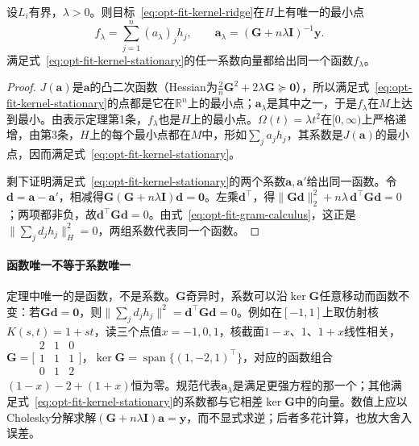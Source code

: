 \begin{theorem}[正则化平方拟合的解]
\label{thm:opt-fit-kernel-ridge}
设$L_i$有界，$\lambda>0$。则目标~\eqref{eq:opt-fit-kernel-ridge}在$H$上有唯一的最小点
\[
  f_\lambda=\sum_{j=1}^n(a_\lambda)_jh_j,\qquad \bm a_\lambda=(\bm G+n\lambda\bm I)^{-1}\bm y .
\]
满足式~\eqref{eq:opt-fit-kernel-stationary}的任一系数向量都给出同一个函数$f_\lambda$。
\end{theorem}

\begin{proof}
$J(\bm a)$是$\bm a$的凸二次函数（Hessian为$\tfrac2n\bm G^2+2\lambda\bm G\succeq\bm0$），所以满足式~\eqref{eq:opt-fit-kernel-stationary}的点都是它在$\mathbb R^n$上的最小点；$\bm a_\lambda$是其中之一，于是$f_\lambda$在$M$上达到最小。由表示定理第1条，$f_\lambda$也是$H$上的最小点。$\Omega(t)=\lambda t^2$在$[0,\infty)$上严格递增，由第3条，$H$上的每个最小点都在$M$中，形如$\sum_ja_jh_j$，其系数是$J(\bm a)$的最小点，因而满足式~\eqref{eq:opt-fit-kernel-stationary}。

剩下证明满足式~\eqref{eq:opt-fit-kernel-stationary}的两个系数$\bm a,\bm a'$给出同一函数。令$\bm d=\bm a-\bm a'$，相减得$\bm G(\bm G+n\lambda\bm I)\bm d=\bm 0$。左乘$\bm d^\top$，得$\|\bm G\bm d\|_2^2+n\lambda\,\bm d^\top\bm G\bm d=0$；两项都非负，故$\bm d^\top\bm G\bm d=0$。由式~\eqref{eq:opt-fit-gram-calculus}，这正是$\bigl\|\sum_jd_jh_j\bigr\|_H^2=0$，两组系数代表同一个函数。
\end{proof}

\paragraph{函数唯一不等于系数唯一}
定理中唯一的是函数，不是系数。$\bm G$奇异时，系数可以沿$\ker\bm G$任意移动而函数不变：若$\bm G\bm d=\bm 0$，则$\|\sum_jd_jh_j\|^2=\bm d^\top\bm G\bm d=0$。例如在$[-1,1]$上取仿射核$K(s,t)=1+st$，读三个点值$x=-1,0,1$，核截面$1-x$、$1$、$1+x$线性相关，$\bm G=\bigl[\begin{smallmatrix}2&1&0\\1&1&1\\0&1&2\end{smallmatrix}\bigr]$，$\ker\bm G=\operatorname{span}\{(1,-2,1)^\top\}$，对应的函数组合$(1-x)-2+(1+x)$恒为零。规范代表$\bm a_\lambda$是满足更强方程的那一个；其他满足式~\eqref{eq:opt-fit-kernel-stationary}的系数都与它相差$\ker\bm G$中的向量。数值上应以Cholesky分解求解$(\bm G+n\lambda\bm I)\bm a=\bm y$，而不显式求逆；后者多花计算，也放大舍入误差。


